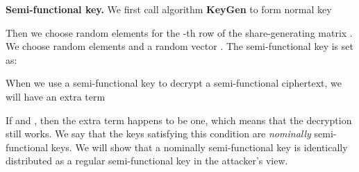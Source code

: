 \documentclass[twocolumn]{svjour3}          \smartqed  \usepackage{graphicx}
\begin{document}
\medskip
\noindent\textbf{Semi-functional key.} We first call algorithm \textbf{KeyGen} to form normal key

Then we choose random elements  for the -th row of the share-generating matrix . We choose random elements
 and a random vector  . The semi-functional key
is set as:




\medskip

\begin{remark} When we use a semi-functional key to decrypt a semi-functional ciphertext, we will have an extra term

If  and , then the extra term
happens to be one, which means that the decryption still works. We say that the keys satisfying this condition are \emph{nominally} semi-functional keys.
We will show that a nominally semi-functional key is identically distributed as a regular semi-functional key in the attacker's view.
\end{remark}
\end{document}
